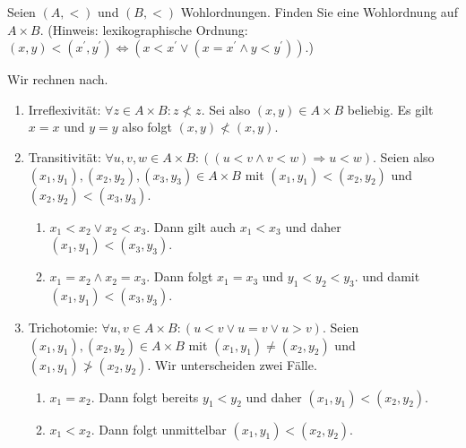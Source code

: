 
\begin{exercise}[239]

\phantom{}
	Seien $(A,<)$ und $(B,<)$ Wohlordnungen. Finden Sie eine Wohlordnung auf $A \times B$. (Hinweis: lexikographische Ordnung: $(x,y) < (x^\prime, y^\prime) \Leftrightarrow (x < x^\prime \lor (x = x^\prime \land y < y^\prime))$.)

\end{exercise}


\begin{solution}

\phantom{}
	Wir rechnen nach.
	\begin{enumerate}
		\item Irreflexivität: $\forall z \in A \times B: z \nless z$. Sei also $(x,y) \in A \times B$ beliebig. Es gilt $x = x$ und $y = y$ also folgt $(x,y) \nless (x,y)$.

		\item Transitivität: $\forall u,v,w \in A \times B: ((u < v \land v < w) \Rightarrow u < w)$. Seien also $(x_1, y_1), (x_2, y_2), (x_3, y_3) \in A \times B$ mit $(x_1, y_1) < (x_2, y_2)$ und $(x_2, y_2) < (x_3, y_3)$.
		\begin{enumerate}[label = Fall \arabic*:]
			\item $x_1 < x_2 \lor x_2 < x_3$. Dann gilt auch $x_1 < x_3$ und daher $(x_1, y_1) < (x_3, y_3)$.

			\item $x_1 = x_2 \land x_2 = x_3$. Dann folgt $x_1 = x_3$ und $y_1 < y_2 < y_3$. und damit $(x_1, y_1) < (x_3,y_3)$.
		\end{enumerate}

		\item Trichotomie: $\forall u,v \in A \times B: (u < v \lor u = v \lor u > v)$. Seien $(x_1, y_1), (x_2,y_2) \in A \times B$ mit $(x_1, y_1) \neq (x_2, y_2)$ und $(x_1, y_1) \ngtr (x_2, y_2)$. Wir unterscheiden zwei Fälle.
		\begin{enumerate}[label = Fall \arabic*:]
			\item $x_1 = x_2$. Dann folgt bereits $y_1 < y_2$ und daher $(x_1, y_1) < (x_2, y_2)$.
			\item $x_1 < x_2$. Dann folgt unmittelbar $(x_1, y_1) < (x_2, y_2)$.
		\end{enumerate}


\end{enumerate}
\end{solution}

